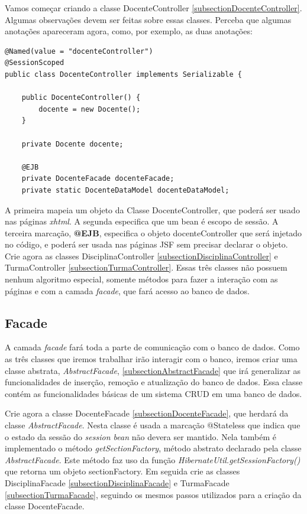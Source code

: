 \documentclass[12pt,a4paper]{article}
\begin{document}
Vamos começar criando a classe DocenteController \ref{subsectionDocenteController}.
Algumas observações devem ser feitas sobre essas classes. Perceba que algumas anotações apareceram agora, como, por exemplo, as duas anotações:
\lstset{language=JAVA}
\begin{lstlisting}
@Named(value = "docenteController")
@SessionScoped
public class DocenteController implements Serializable {

    public DocenteController() {
        docente = new Docente();
    }

    private Docente docente;

    @EJB
    private DocenteFacade docenteFacade;
    private static DocenteDataModel docenteDataModel;
\end{lstlisting}

A primeira mapeia um objeto da Classe DocenteController, que poderá ser usado nas páginas  \textit{xhtml}. A segunda especifica que um bean é escopo de sessão. A terceira marcação, \textbf{@EJB}, especifica o objeto docenteController que será injetado no código, e poderá ser usada nas páginas JSF sem precisar declarar o objeto.\\

Crie agora as classes DisciplinaController \ref{subsectionDisciplinaController} e TurmaController \ref{subsectionTurmaController}. Essas três classes não possuem nenhum algoritmo especial, somente métodos para fazer a interação com as páginas e com a camada \textit{facade}, que fará acesso ao banco de dados.


\subsection{Facade}
A camada \textit{facade} fará toda a parte de comunicação com o banco de dados. Como as três classes que iremos trabalhar irão interagir com o banco, iremos criar uma classe abstrata, \textit{AbstractFacade}, \ref{subsectionAbstractFacade} que irá generalizar as funcionalidades de inserção, remoção e atualização do banco de dados. Essa classe contém as funcionalidades básicas de um sistema CRUD em uma banco de dados.


 Crie agora a classe DocenteFacade \ref{subsectionDocenteFacade}, que herdará da classe \textit{AbstractFacade}. Nesta classe é usada a marcação @Stateless que indica que o estado da sessão do \textit{session bean} não devera ser mantido. Nela também é implementado o método \textit{getSectionFactory}, método abstrato declarado pela classe \textit{AbstractFacade}. Este método faz uso da função \textit{HibernateUtil.getSessionFactory()} que retorna um objeto sectionFactory. Em seguida crie as classes DisciplinaFacade \ref{subsectionDisciplinaFacade} e TurmaFacade \ref{subsectionTurmaFacade}, seguindo os mesmos passos utilizados para a criação da classe DocenteFacade.
 
\end{document}
